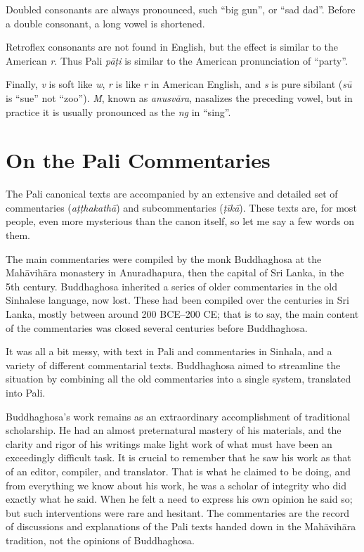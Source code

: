 \documentclass[12pt,openany]{book}%
\begin{document}
Doubled consonants are always pronounced, such “big gun”, or “sad dad”. Before a double consonant, a long vowel is shortened.

Retroflex consonants are not found in English, but the effect is similar to the American \textit{r}. Thus Pali \textit{\textsanskrit{pāṭi}} is similar to the American pronunciation of “party”.

Finally, \textit{v} is soft like \textit{w}, \textit{r} is like \textit{r} in American English, and \textit{s} is pure sibilant (\textit{\textsanskrit{sū}} is “sue” not “zoo”). \textit{Ṁ}, known as \textit{\textsanskrit{anusvāra}}, nasalizes the preceding vowel, but in practice it is usually pronounced as the \textit{ng} in “sing”.

\section*{On the Pali Commentaries}

The Pali canonical texts are accompanied by an extensive and detailed set of commentaries (\textit{\textsanskrit{aṭṭhakathā}}) and subcommentaries (\textit{\textsanskrit{ṭīkā}}). These texts are, for most people, even more mysterious than the canon itself, so let me say a few words on them.

The main commentaries were compiled by the monk Buddhaghosa at the \textsanskrit{Mahāvihāra} monastery in Anuradhapura, then the capital of Sri Lanka, in the 5th century. Buddhaghosa inherited a series of older commentaries in the old Sinhalese language, now lost. These had been compiled over the centuries in Sri Lanka, mostly between around 200 BCE–200 CE; that is to say, the main content of the commentaries was closed several centuries before Buddhaghosa.

It was all a bit messy, with text in Pali and commentaries in Sinhala, and a variety of different commentarial texts. Buddhaghosa aimed to streamline the situation by combining all the old commentaries into a single system, translated into Pali.

Buddhaghosa’s work remains as an extraordinary accomplishment of traditional scholarship. He had an almost preternatural mastery of his materials, and the clarity and rigor of his writings make light work of what must have been an exceedingly difficult task. It is crucial to remember that he saw his work as that of an editor, compiler, and translator. That is what he claimed to be doing, and from everything we know about his work, he was a scholar of integrity who did exactly what he said. When he felt a need to express his own opinion he said so; but such interventions were rare and hesitant. The commentaries are the record of discussions and explanations of the Pali texts handed down in the \textsanskrit{Mahāvihāra} tradition, not the opinions of Buddhaghosa.
\end{document}
